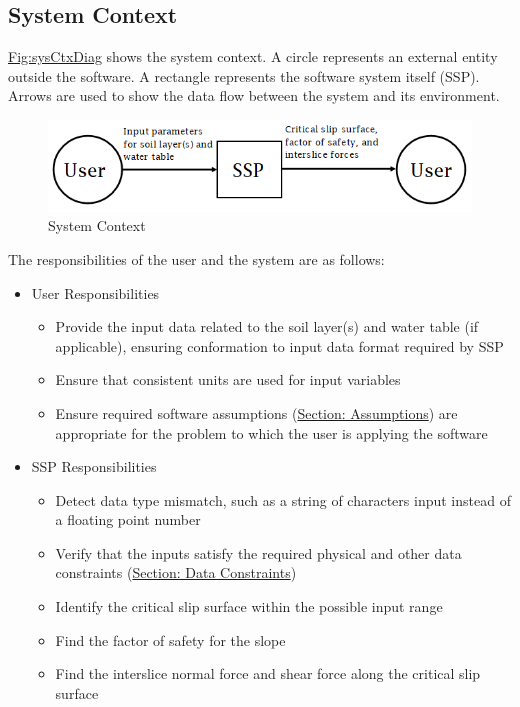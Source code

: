 \documentclass[12pt]{article}
\begin{document}
\subsection{System Context}
\label{Sec:SysContext}
\hyperref[Figure:sysCtxDiag]{Fig:sysCtxDiag} shows the system context. A circle represents an external entity outside the software. A rectangle represents the software system itself (SSP). Arrows are used to show the data flow between the system and its environment.

\begin{figure}
\begin{center}
\includegraphics[width=\textwidth]{../../../datafiles/SSP/SystemContextFigure.png}
\caption{System Context}
\label{Figure:sysCtxDiag}
\end{center}
\end{figure}
The responsibilities of the user and the system are as follows:

\begin{itemize}
\item{User Responsibilities}
\begin{itemize}
\item{Provide the input data related to the soil layer(s) and water table (if applicable), ensuring conformation to input data format required by SSP}
\item{Ensure that consistent units are used for input variables}
\item{Ensure required software assumptions (\hyperref[Sec:Assumps]{Section: Assumptions}) are appropriate for the problem to which the user is applying the software}
\end{itemize}
\item{SSP Responsibilities}
\begin{itemize}
\item{Detect data type mismatch, such as a string of characters input instead of a floating point number}
\item{Verify that the inputs satisfy the required physical and other data constraints (\hyperref[Sec:DataConstraints]{Section: Data Constraints})}
\item{Identify the critical slip surface within the possible input range}
\item{Find the factor of safety for the slope}
\item{Find the interslice normal force and shear force along the critical slip surface}
\end{itemize}
\end{itemize}
\end{document}
